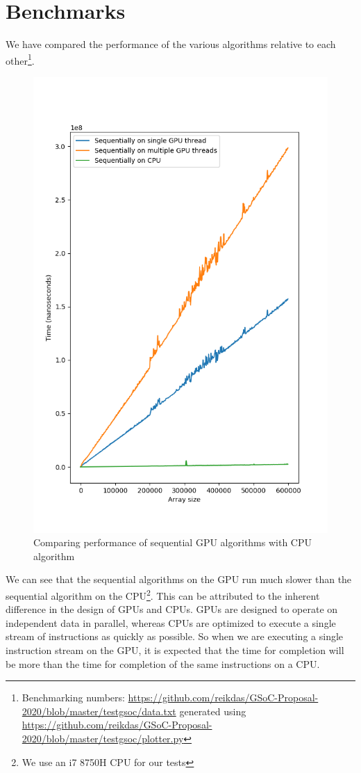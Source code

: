 \documentclass{article}
\begin{document}
\section{Benchmarks}
We have compared the performance of the various algorithms relative to each other\footnote{Benchmarking numbers: \url{https://github.com/reikdas/GSoC-Proposal-2020/blob/master/testgsoc/data.txt} generated using \url{https://github.com/reikdas/GSoC-Proposal-2020/blob/master/testgsoc/plotter.py}}.
\begin{figure}[H]
\hfill\includegraphics[scale=0.5]{Graphics/naivegpucpu.png}\hspace*{\fill}
\caption{Comparing performance of sequential GPU algorithms with CPU algorithm}
\end{figure}
We can see that the sequential algorithms on the GPU run much slower than the sequential algorithm on the CPU\footnote{We use an i7 8750H CPU for our tests}. This can be attributed to the inherent difference in the design of GPUs and CPUs. GPUs are designed to operate on independent data in parallel, whereas CPUs are optimized to execute a single stream of instructions as quickly as possible. So when we are executing a single instruction stream on the GPU, it is expected that the time for completion will be more than the time for completion of the same instructions on a CPU.
\end{document}
